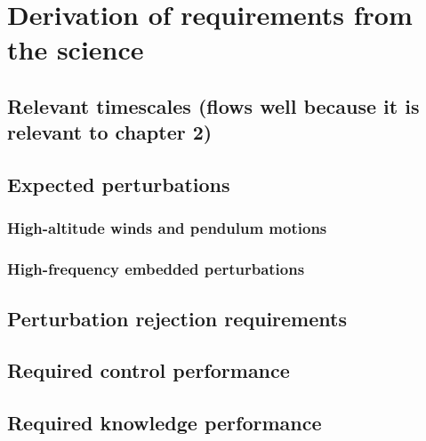 \section{Derivation of requirements from the science}
\subsection{	Relevant timescales (flows well because it is relevant to chapter 2)}
\subsection{	Expected perturbations}
\subsubsection{	High-altitude winds and pendulum motions}
\subsubsection{	High-frequency embedded perturbations}
\subsection{	Perturbation rejection requirements }
\subsection{	Required control performance}
\subsection{	Required knowledge performance}
